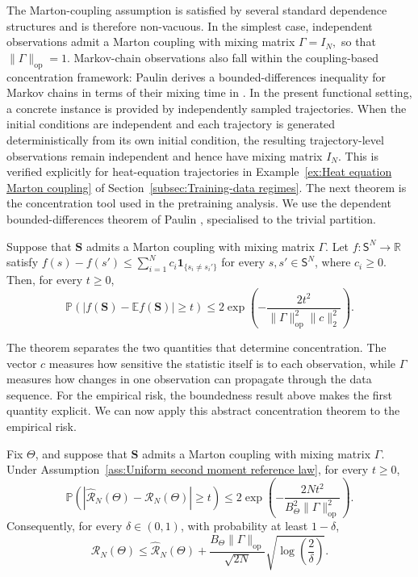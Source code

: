 The Marton-coupling assumption is satisfied by several standard dependence structures and is therefore non-vacuous. In the simplest case, independent observations admit a Marton coupling with mixing matrix
\(
\Gamma=I_N,
\)
so that \(\|\Gamma\|_{\mathrm{op}}=1\). Markov-chain observations also fall within the coupling-based concentration framework: Paulin derives a bounded-differences inequality for Markov chains in terms of their mixing time in \cite[Corollary~2.11]{Paulin2015}. In the present functional setting, a concrete instance is provided by independently sampled trajectories. When the initial conditions are independent and each trajectory is generated deterministically from its own initial condition, the resulting trajectory-level observations remain independent and hence have mixing matrix \(I_N\). This is verified explicitly for heat-equation trajectories in Example~\ref{ex:Heat equation Marton coupling} of Section~\ref{subsec:Training-data regimes}.
The next theorem is the concentration tool used in the pretraining analysis. We use the dependent bounded-differences theorem of Paulin \cite[Theorem~2.1]{Paulin2015}, specialised to the trivial partition.

\begin{theorem}
\label{thm:Dependent bounded differences Marton}
Suppose that \(\mathbf S\) admits a Marton coupling with mixing matrix \(\Gamma\). Let \(f:\mathsf S^N\to\mathbb R\) satisfy
\(
f(s)-f(s')
\leqslant
\sum_{i=1}^N
c_i\mathbf 1_{\{s_i\neq s_i'\}}
\)
for every \(s,s'\in\mathsf S^N\), where \(c_i\geq0\). Then, for every \(t\geq0\),
\[
\mathbb P
\left(
|f(\mathbf S)-\mathbb Ef(\mathbf S)|
\geq t
\right)
\leqslant
2\exp
\left(
-\frac{2t^2}
{\|\Gamma\|_{\mathrm{op}}^2\|c\|_2^2}
\right).
\]
\end{theorem}

The theorem separates the two quantities that determine concentration. The vector \(c\) measures how sensitive the statistic itself is to each observation, while \(\Gamma\) measures how changes in one observation can propagate through the data sequence. For the empirical risk, the boundedness result above makes the first quantity explicit.
We can now apply this abstract concentration theorem to the empirical risk.

\begin{theorem}
\label{thm:Fixed-parameter Marton generalisation bound}
Fix \(\Theta\), and suppose that \(\mathbf S\) admits a Marton coupling with mixing matrix \(\Gamma\). Under Assumption~\ref{ass:Uniform second moment reference law}, for every \(t\geq0\),
\[
\mathbb P
\left(
\left|
\widehat{\mathcal R}_N(\Theta)
-
\mathcal R_N(\Theta)
\right|
\geq t
\right)
\leqslant
2\exp
\left(
-\frac{2Nt^2}
{B_\Theta^2\|\Gamma\|_{\mathrm{op}}^2}
\right).
\]
Consequently, for every \(\delta\in(0,1)\), with probability at least \(1-\delta\),
\[
\mathcal R_N(\Theta)
\leqslant
\widehat{\mathcal R}_N(\Theta)
+
\frac{
B_\Theta\|\Gamma\|_{\mathrm{op}}
}{
\sqrt{2N}
}
\sqrt{
\log\left(\frac2\delta\right)
}.
\]
\end{theorem}

